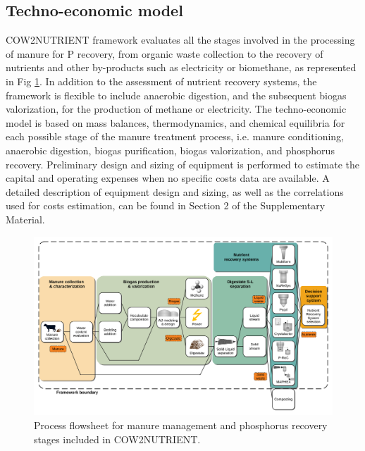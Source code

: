 \documentclass[authoryear]{elsarticle}
\begin{document}
\subsection{Techno-economic model}
COW2NUTRIENT framework evaluates all the stages involved in the processing of manure for P recovery, from organic waste collection to the recovery of nutrients and other by-products such as electricity or biomethane, as represented in Fig \ref{fig:flowsheet}. In addition to the assessment of nutrient recovery systems, the framework is flexible to include anaerobic digestion, and the subsequent biogas valorization, for the production of methane or electricity. 
The techno-economic model is based on mass balances, thermodynamics, and chemical equilibria for each possible stage of the manure treatment process, i.e. manure conditioning, anaerobic digestion, biogas purification, biogas valorization, and phosphorus recovery. Preliminary design and sizing of equipment is performed to estimate the capital and operating expenses when no specific costs data are available. A detailed description of equipment design and sizing, as well as the correlations used for costs estimation, can be found in Section 2 of the Supplementary Material.

\begin{figure}[h]
	\centering
	\includegraphics[width=0.95\linewidth, trim=1cm 1cm 1cm 1cm, clip]{Process_Flowsheet2.pdf} 
	\caption{Process flowsheet for manure management and phosphorus recovery stages included in COW2NUTRIENT.}
	\label{fig:flowsheet}
\end{figure}
\end{document}
